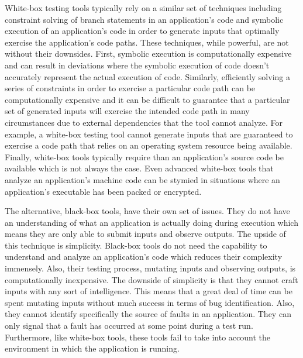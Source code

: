     White-box testing tools typically rely on a similar set of techniques including constraint solving of branch
    statements in an application's code and symbolic execution of an application's code in order to generate inputs that
    optimally exercise the application's code paths. These techniques, while powerful, are not without their downsides.
    First, symbolic execution is computationally expensive and can result in deviations where the symbolic execution of
    code doesn't accurately represent the actual execution of code. Similarly, efficiently solving a series of
    constraints in order to exercise a particular code path can be computationally expensive and it can be difficult to
    guarantee that a particular set of generated inputs will exercise the intended code path in many circumstances due
    to external dependencies that the tool cannot analyze. For example, a white-box testing tool cannot generate inputs
    that are guaranteed to exercise a code path that relies on an operating system resource being available. Finally,
    white-box tools typically require than an application's source code be available which is not always the case. Even
    advanced white-box tools that analyze an application's machine code can be stymied in situations where an
    application's executable has been packed or encrypted.

    The alternative, black-box tools, have their own set of issues. They do not have an understanding of what an
    application is actually doing during execution which means they are only able to submit inputs and observe outputs.
    The upside of this technique is simplicity. Black-box tools do not need the capability to understand and analyze an
    application's code which reduces their complexity immensely. Also, their testing process, mutating inputs and
    observing outputs, is computationally inexpensive. The downside of simplicity is that they cannot craft inputs with
    any sort of intelligence. This means that a great deal of time can be spent mutating inputs without much success
    in terms of bug identification. Also, they cannot identify specifically the source of faults in an application. They
    can only signal that a fault has occurred at some point during a test run. Furthermore, like white-box tools, these
    tools fail to take into account the environment in which the application is running.

